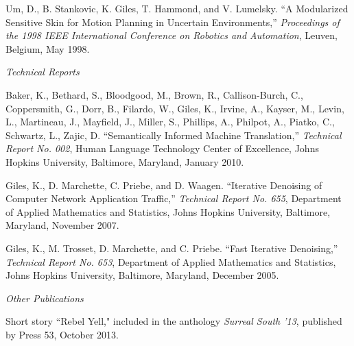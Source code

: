 \documentclass[11pt,article,oneside]{memoir}
\begin{document}
\ind Um, D., B. Stankovic, K. Giles, T. Hammond, and V. Lumelsky. “A Modularized Sensitive Skin for Motion Planning in Uncertain Environments,” \emph{Proceedings of the 1998 IEEE International Conference on Robotics and Automation}, Leuven, Belgium, May 1998.



\bigskip

\noindent\emph{Technical Reports \vspace{0.05in}}

 

\ind Baker, K., Bethard, S., Bloodgood, M., Brown, R., Callison-Burch, C., Coppersmith, G., Dorr, B., Filardo, W., Giles, K., Irvine, A., Kayser, M., Levin, L., Martineau, J., Mayfield, J., Miller, S., Phillips, A., Philpot, A., Piatko, C., Schwartz, L., Zajic, D. “Semantically Informed Machine Translation,” \emph{Technical Report No. 002}, Human Language Technology Center of Excellence, Johns Hopkins University, Baltimore, Maryland, January 2010.

\ind Giles, K., D. Marchette, C. Priebe, and D. Waagen. “Iterative Denoising of Computer Network Application Traffic,” \emph{Technical Report No. 655}, Department of Applied Mathematics and Statistics, Johns Hopkins University, Baltimore, Maryland, November 2007.

\ind Giles, K., M. Trosset, D. Marchette, and C. Priebe. “Fast Iterative Denoising,” \emph{Technical Report No. 653}, Department of Applied Mathematics and Statistics, Johns Hopkins University, Baltimore, Maryland, December 2005.



\bigskip

\noindent\emph{Other Publications \vspace{0.05in}}


\ind Short story “Rebel Yell," included in the anthology \emph{Surreal South ’13}, published by Press 53, October 2013.

\end{document}

